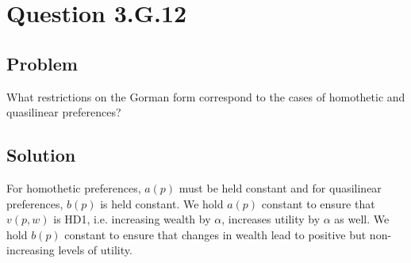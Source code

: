 \documentclass[10pt, a4paper]{article}
\begin{document}
  \section{Question 3.G.12}
    \subsection{Problem}
       What restrictions on the Gorman form correspond to the cases of homothetic and quasilinear preferences?
    \subsection{Solution}
      For homothetic preferences, $a(p)$ must be held constant and for quasilinear preferences, $b(p)$ is held constant. We hold $a(p)$ constant to ensure that $v(p,w)$ is HD1, i.e. increasing wealth by $\alpha$, increases utility by $\alpha$ as well. We hold $b(p)$ constant to ensure that changes in wealth lead to positive but non-increasing levels of utility. 
\end{document}
